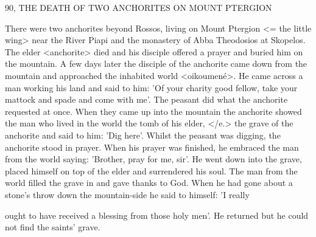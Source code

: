 90, THE DEATH OF TWO ANCHORITES
ON MOUNT PTERGION

There were two anchorites beyond Rossos, living on Mount
Ptergion <= the little wing> near the River Piapi and the monastery
of Abba Theodosios at Skopelos.
The elder <anchorite> died and
his disciple offered a prayer and buried him on the mountain.
A few
days later the disciple of the anchorite came down from the
mountain and approached the inhabited world <oikoumené>.
He
came across a man working his land and said to him: 'Of your
charity good fellow, take your mattock and spade and come with
me'.
The peasant did what the anchorite requested at once.
When
they came up into the mountain the anchorite showed the man who
lived in the world the tomb of his elder, </e.> the grave of the
anchorite and said to him: 'Dig here'.
Whilst the peasant was
digging, the anchorite stood in prayer.
When his prayer was
finished, he embraced the man from the world saying: 'Brother, pray
for me, sir'.
He went down into the grave, placed himself on top of
the elder and surrendered his soul.
The man from the world filled
the grave in and gave thanks to God.
When he had gone about a
stone's throw down the mountain-side he said to himself: 'I really

ought to have received a blessing from those holy men'.
He returned
but he could not find the saints' grave.

